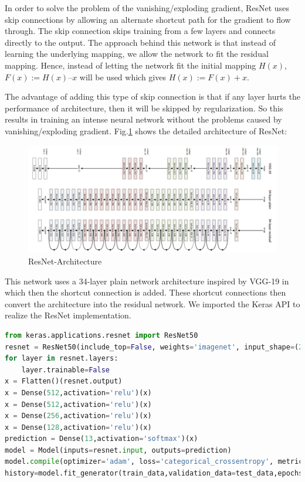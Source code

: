 In order to solve the problem of the vanishing/exploding gradient, ResNet uses skip connections by allowing an alternate shortcut path for the gradient to flow through. The skip connection skips training from a few layers and connects directly to the output. The approach behind this network is that instead of learning the underlying mapping, we allow the network to fit the residual mapping. Hence, instead of letting the network fit the initial mapping $H(x)$, $F(x) := H(x) – x$ will be used which gives $H(x) := F(x) + x$. 
 
The advantage of adding this type of skip connection is that if any layer hurts the performance of architecture, then it will be skipped by regularization. So this results in training an intense neural network without the problems caused by vanishing/exploding gradient. Fig.\ref{pic:resnet} shows the detailed architecture of ResNet:


\begin{figure}[H]
    \centering\includegraphics[width=12cm]{./figures/ResNet.png}
    \caption{ResNet-Architecture}
    \label{pic:resnet}
\end{figure}

This network uses a 34-layer plain network architecture inspired by VGG-19 in which then the shortcut connection is added. These shortcut connections then convert the architecture into the residual network. We imported the Keras API to realize the ResNet implementation. 

\begin{lstlisting}[language=python]
from keras.applications.resnet import ResNet50
resnet = ResNet50(include_top=False, weights='imagenet', input_shape=(264,264,3))
for layer in resnet.layers:
    layer.trainable=False
x = Flatten()(resnet.output)
x = Dense(512,activation='relu')(x)
x = Dense(512,activation='relu')(x)
x = Dense(256,activation='relu')(x)
x = Dense(128,activation='relu')(x)
prediction = Dense(13,activation='softmax')(x)
model = Model(inputs=resnet.input, outputs=prediction)
model.compile(optimizer='adam', loss='categorical_crossentropy', metrics=['accuracy'],weighted_metrics=[tf.keras.metrics.Precision(), tf.keras.metrics.Recall()])
history=model.fit_generator(train_data,validation_data=test_data,epochs=150,steps_per_epoch=len(train_data),validation_steps=len(test_data))
\end{lstlisting}
\vspace{-0.6cm}

